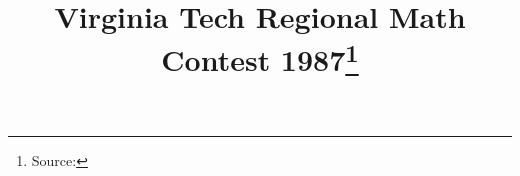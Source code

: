 \documentclass[10pt]{article}
\begin{document}
\title{Virginia Tech Regional Math Contest 1987\footnote{Source: \source}}
\author{\vspace{-2ex}}
\date{\vspace{-6ex}} %
\maketitle








\end{document}
